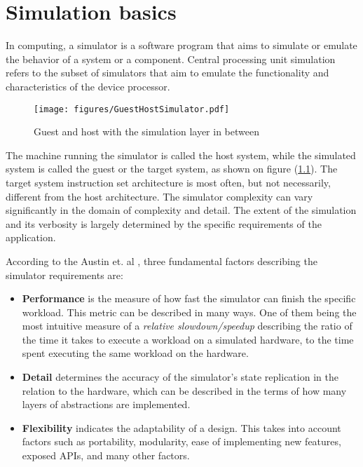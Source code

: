
\chapter{Simulation basics}

In computing, a simulator is a software program that aims to simulate or emulate the behavior of a system or a component.
Central processing unit simulation refers to the subset of simulators that aim to emulate the functionality and
characteristics of the device processor.

\begin{figure}[h]
	\centering
	\vspace{10px}
	\texttt{[image: figures/GuestHostSimulator.pdf]}
	\caption{Guest and host with the simulation layer in between}
	\label{fig:simulator-layer}
\end{figure}

The machine running the simulator is called the host system, while the simulated system is called the guest or the target
system, as shown on figure (\ref{fig:simulator-layer}). The target system instruction set architecture is most often, but not necessarily, different from the host
architecture. The simulator complexity can vary significantly in the domain of complexity and detail.
The extent of the simulation and its verbosity is largely determined by the specific requirements of the application.

According to the Austin et. al \cite{Simplescalar}, three fundamental factors describing the simulator requirements are:

\begin{itemize}
	\item{\textbf{Performance} is the measure of how fast the simulator can finish the specific workload. This metric
	can be described in many ways. One of them being the most intuitive measure of a \textit{relative slowdown/speedup}
	describing the ratio of the time it takes to execute a workload on a simulated hardware, to the time spent
	executing the same workload on the hardware.}
	\item{\textbf{Detail} determines the accuracy of the simulator's state replication in the relation to the hardware,
	which can be described in the terms of how many layers of abstractions are implemented.}
	\item{\textbf{Flexibility} indicates the adaptability of a design. This takes into account factors such as
	portability, modularity, ease of implementing new features, exposed APIs, and many other factors.}
\end{itemize}

